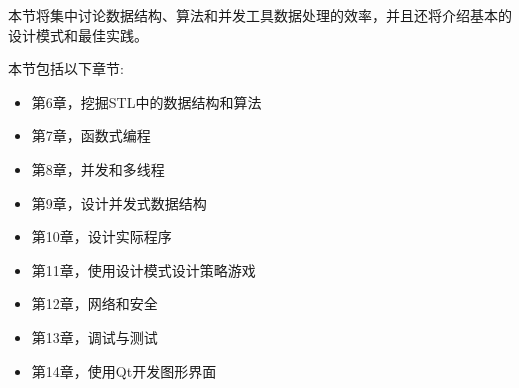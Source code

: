 本节将集中讨论数据结构、算法和并发工具数据处理的效率，并且还将介绍基本的设计模式和最佳实践。 \par

本节包括以下章节: \par

\begin{itemize}
	\item 第6章，挖掘STL中的数据结构和算法
	\item 第7章，函数式编程
	\item 第8章，并发和多线程
	\item 第9章，设计并发式数据结构
	\item 第10章，设计实际程序
	\item 第11章，使用设计模式设计策略游戏
	\item 第12章，网络和安全
	\item 第13章，调试与测试
	\item 第14章，使用Qt开发图形界面
\end{itemize}

\newpage